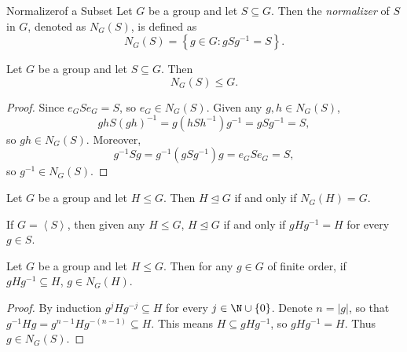 \documentclass[pmath347]{subfiles}
\begin{document}
    \begin{definition}{Normalizer}{of a Subset}
        Let $G$ be a group and let $S\subseteq G$. Then the \emph{normalizer} of $S$ in $G$, denoted as $N_G\left( S \right)$, is defined as
        \begin{equation*}
            N_G\left( S \right) = \left\lbrace g\in G:gSg^{-1} = S \right\rbrace .
        \end{equation*}
    \end{definition}

    \begin{prop}{}
        Let $G$ be a group and let $S\subseteq G$. Then
        \begin{equation*}
            N_G\left( S \right) \leq G.
        \end{equation*}
    \end{prop}

    \begin{proof}
        Since $e_GSe_G=S$, so $e_G\in N_G\left( S \right)$. Given any $g,h\in N_G\left( S \right)$,
        \begin{equation*}
            ghS\left( gh \right) ^{-1} = g\left( hSh^{-1}  \right) g^{-1} = gSg^{-1} = S,
        \end{equation*}
        so $gh\in N_G\left( S \right)$. Moreover,
        \begin{equation*}
            g^{-1} Sg = g^{-1} \left( gSg^{-1}  \right) g = e_GSe_G = S,
        \end{equation*}
        so $g^{-1} \in N_G\left( S \right)$.
    \end{proof}

    \begin{prop}{}
        Let $G$ be a group and let $H\leq G$. Then $H\trianglelefteq G$ if and only if $N_G\left( H \right) = G$.
    \end{prop}

    \clearpage
    \begin{cor}{}
        If $G = \left< S \right>$, then given any $H\leq G$, $H\trianglelefteq G$ if and only if $gHg^{-1} = H$ for every $g\in S$. 
    \end{cor}	

    \begin{prop}{}
        Let $G$ be a group and let $H\leq G$. Then for any $g\in G$ of finite order, if $gHg^{-1} \subseteq H$, $g\in N_G\left( H \right)$.
    \end{prop}

    \begin{proof}
        By induction $g^jHg^{-j}\subseteq H$ for every $j\in\N\cup\left\lbrace 0 \right\rbrace$. Denote $n=\left| g \right|$, so that $g^{-1} Hg = g^{n-1}Hg^{-\left( n-1 \right) }\subseteq H$. This means $H\subseteq gHg^{-1}$, so $gHg^{-1} = H$. Thus $g\in N_G\left( S \right) $.
    \end{proof}
\end{document}
